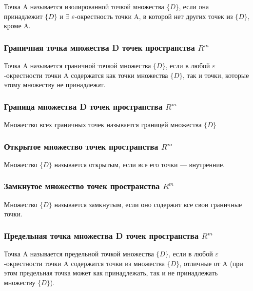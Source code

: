 \documentclass[a4paper, 12pt]{article}
\renewcommand{\epsilon}{\varepsilon}
\newcommand{\Rm}{\texorpdfstring{$R^m$}{Lg}}
\begin{document}
            Точка A называется изолированной точкой множества $\{D\}$,
            если она принадлежит $\{D\}$ и $\exists$  $\epsilon$-окрестность точки
            A, в которой нет других точек из $\{D\}$, кроме A.

            \subsubsection{Граничная точка множества D точек пространства \Rm}

            Точка A называется граничной точкой множества $\{D\}$, если
            в любой $\epsilon$ -окрестности точки A содержатся как
            точки множества $\{D\}$, так и точки, которые этому
            множеству не принадлежат.

            \subsubsection{Граница множества D точек пространства \Rm}

            Множество всех граничных точек называется границей множества $\{D\}$

            \subsubsection{Открытое множество точек пространства \Rm}

            Множество $\{D\}$ называется открытым, если все его точки — внутренние.

            \subsubsection{Замкнутое множество точек пространства \Rm}

            Множество $\{D\}$ называется замкнутым, если оно содержит
            все свои граничные точки.

            \subsubsection{Предельная точка множества D точек пространства \Rm}

            Точка A называется предельной точкой множества $\{D\}$, если
            в любой $\epsilon$ -окрестности точки A содержатся точки из множества
            $\{D\}$, отличные от A (при этом предельная точка может как
            принадлежать, так и не принадлежать множеству $\{D\}$).
\end{document}
